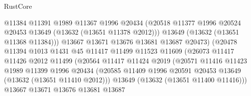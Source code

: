 \begin{lexlean}{RustCore}
\begin{coremodule}
                                  @11384
                                  @11391
                                  @1989
                                  @11367
                                  @1996
                                  @20434
                                  (@20518
                                    @11377
                                    @1996
                                    @20524
                                    @20453
                                    @13649
                                    (@13632 (@13651 @11378 @2012)))
                                  @13649
                                  (@13632 (@13651 @11368 @11384)))
                                @13667
                                @13671
                                @13676
                                @13681
                                @13687
                                @20473)
                              (@20478
                                @11394
                                @1013
                                @1431
                                @45
                                @11417
                                @11499
                                @11523
                                @11609
                                (@26073
                                  @11417
                                  @11426
                                  @2012
                                  @11499
                                  (@20564
                                    @11417
                                    @11424
                                    @2019
                                    (@20571
                                      @11416
                                      @11423
                                      @1989
                                      @11399
                                      @1996
                                      @20434
                                      (@20585
                                        @11409
                                        @1996
                                        @20591
                                        @20453
                                        @13649
                                        (@13632 (@13651 @11410 @2012)))
                                      @13649
                                      (@13632 (@13651 @11400 @11416)))
                                    @13667
                                    @13671
                                    @13676
                                    @13681
                                    @13687

\end{coremodule}
\end{lexlean}
